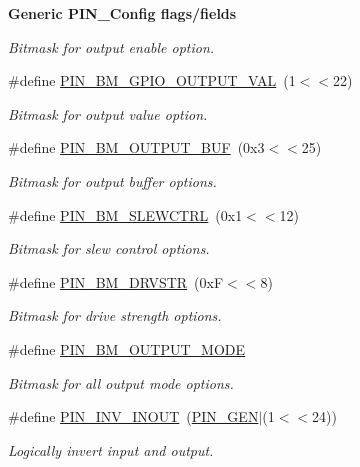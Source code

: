 \begin{Indent}{\bf Generic P\+I\+N\+\_\+\+Config flags/fields}
\begin{DoxyCompactItemize}
\begin{DoxyCompactList}\small\item\em Bitmask for output enable option. \end{DoxyCompactList}\item 
\#define \hyperlink{_p_i_n_8h_a40f78467926deed6685f0beb39594be8}{P\+I\+N\+\_\+\+B\+M\+\_\+\+G\+P\+I\+O\+\_\+\+O\+U\+T\+P\+U\+T\+\_\+\+V\+A\+L}~(1$<$$<$22)
\begin{DoxyCompactList}\small\item\em Bitmask for output value option. \end{DoxyCompactList}\item 
\#define \hyperlink{_p_i_n_8h_ae8cadb31765041c9025447cf9538e687}{P\+I\+N\+\_\+\+B\+M\+\_\+\+O\+U\+T\+P\+U\+T\+\_\+\+B\+U\+F}~(0x3$<$$<$25)
\begin{DoxyCompactList}\small\item\em Bitmask for output buffer options. \end{DoxyCompactList}\item 
\#define \hyperlink{_p_i_n_8h_ab564685f4cfb90c924db8d7993612c4b}{P\+I\+N\+\_\+\+B\+M\+\_\+\+S\+L\+E\+W\+C\+T\+R\+L}~(0x1$<$$<$12)
\begin{DoxyCompactList}\small\item\em Bitmask for slew control options. \end{DoxyCompactList}\item 
\#define \hyperlink{_p_i_n_8h_a743420ef571111b0d87f15c0aebb7834}{P\+I\+N\+\_\+\+B\+M\+\_\+\+D\+R\+V\+S\+T\+R}~(0x\+F$<$$<$8)
\begin{DoxyCompactList}\small\item\em Bitmask for drive strength options. \end{DoxyCompactList}\item 
\#define \hyperlink{_p_i_n_8h_a3ae1cb8c4750a2833e3dc0072bd9de82}{P\+I\+N\+\_\+\+B\+M\+\_\+\+O\+U\+T\+P\+U\+T\+\_\+\+M\+O\+D\+E}
\begin{DoxyCompactList}\small\item\em Bitmask for all output mode options. \end{DoxyCompactList}\item 
\#define \hyperlink{_p_i_n_8h_a4f9620411ef92f88c3d2d7ac6c576635}{P\+I\+N\+\_\+\+I\+N\+V\+\_\+\+I\+N\+O\+U\+T}~(\hyperlink{_p_i_n_8h_ae1f7e47a17caab9697e69e5b9aff270b}{P\+I\+N\+\_\+\+G\+E\+N}$\vert$(1$<$$<$24))
\begin{DoxyCompactList}\small\item\em Logically invert input and output. \end{DoxyCompactList}\item 
$$
\end{DoxyCompactItemize}
\end{Indent}
